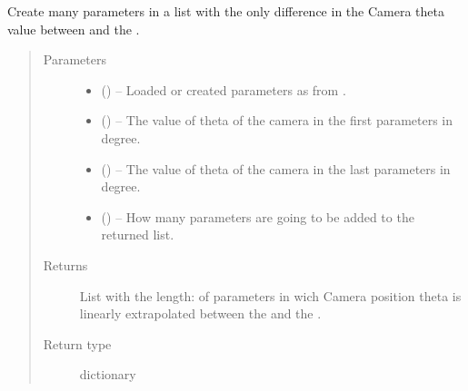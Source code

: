 \documentclass[letterpaper,10pt,english]{sphinxmanual}
\begin{document}
\begin{fulllineitems}
\begin{fulllineitems}
\label{\detokenize{index:dataset.dataset_cuboids.change_apperence_camera_theta}}
Create many parameters in a list with the only difference in the Camera theta value between  and the .
\begin{quote}\begin{description}
\item[{Parameters}] \leavevmode\begin{itemize}
\item {} 
 () -- Loaded or created parameters as from {\hyperref[\detokenize{index:dataset.dataset_cuboids.create_random_parameters}]{}}.

\item {} 
 () -- The value of theta of the camera in the first parameters in degree.

\item {} 
 () -- The value of theta of the camera in the last parameters in degree.

\item {} 
 () -- How many parameters are going to be added to the returned list.

\end{itemize}

\item[{Returns}] \leavevmode
List with the length:  of parameters in wich Camera position theta is linearly extrapolated between the  and the .

\item[{Return type}] \leavevmode
dictionary

\end{description}\end{quote}


\end{fulllineitems}
\end{fulllineitems}
\end{document}
